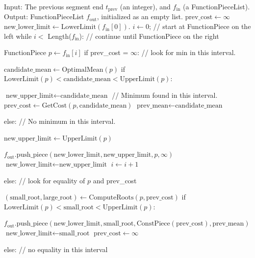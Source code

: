 \documentclass{article}
\begin{document}
\begin{algorithm}[H]
\begin{algorithmic}[1]
\STATE Input: The previous segment end $t_{\text{prev}}$ (an integer), 
 and $f_{\text{in}}$ (a FunctionPieceList).
\STATE Output: FunctionPieceList $f_{\text{out}}$, initialized as an empty list.
\STATE $\text{prev\_cost} \gets\infty$
\STATE $\text{new\_lower\_limit}\gets \text{LowerLimit}(f_{\text{in}}[0])$.
\STATE $i\gets 0$; // start at FunctionPiece on the left
\STATE while $i < $ Length($f_{\text{in}}$): // continue until FunctionPiece on the right
\begin{ALC@g}
  \STATE FunctionPiece $p\gets f_{\text{in}}[i]$
  \STATE if prev\_cost = $\infty$: // look for min in this interval.
  \begin{ALC@g}
    \STATE $\text{candidate\_mean}\gets \text{OptimalMean}(p)$ 
    \STATE if $\text{LowerLimit}(p)< \text{candidate\_mean} < \text{UpperLimit}(p)$:
    \begin{ALC@g}
      \STATE $\text{new\_upper\_limit}\gets \text{candidate\_mean}$ // Minimum found in this interval.
      \STATE $\text{prev\_cost}\gets \text{GetCost}(p, \text{candidate\_mean})$
      \STATE $\text{prev\_mean}\gets \text{candidate\_mean}$
    \end{ALC@g}
    \STATE else: // No minimum in this interval.
    \begin{ALC@g}
      \STATE 
      $\text{new\_upper\_limit}\gets
 \text{UpperLimit}(p)$
    \end{ALC@g}
    \STATE $f_{\text{out}}\text{.push\_piece}(\text{new\_lower\_limit},\text{new\_upper\_limit},p,\infty)$
    \STATE $\text{new\_lower\_limit}\gets\text{new\_upper\_limit}$
    \STATE $i\gets i+1$
  \end{ALC@g}
  \STATE else: // look for equality of $p$ and prev\_cost
  \begin{ALC@g}
    \STATE $(\text{small\_root},\text{large\_root})\gets\text{ComputeRoots}(p, \text{prev\_cost})$
    \STATE if $\text{LowerLimit}(p) < \text{small\_root} < \text{UpperLimit}(p)$:
    \begin{ALC@g}
      \STATE $f_{\text{out}}\text{.push\_piece}(
      \text{new\_lower\_limit}, 
      \text{small\_root}, 
      \text{ConstPiece}(\text{prev\_cost}), 
      \text{prev\_mean})$
      \STATE $\text{new\_lower\_limit}\gets \text{small\_root}$
      \STATE $\text{prev\_cost}\gets \infty$ 
    \end{ALC@g}
    \STATE else: // no equality in this interval
    \begin{ALC@g}

\end{ALC@g}
\end{ALC@g}
\end{ALC@g}
\end{algorithmic}
\end{algorithm}
\end{document}
